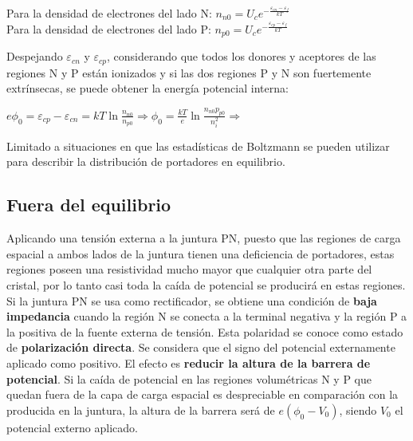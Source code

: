 \documentclass[oneside]{book}
\numberwithin{equation}{section}
\numberwithin{figure}{section}
\numberwithin{table}{section}
\begin{document}
				\begin{center}
					Para la densidad de electrones del lado N: $\displaystyle n_{n0}=U_c e^{-\frac{\varepsilon_{cn}-\varepsilon_f}{kT}}$\\
					Para la densidad de electrones del lado P: $\displaystyle n_{p0}=U_c e^{-\frac{\varepsilon_{cp}-\varepsilon_f}{kT}}$\\		
				\end{center}				
			
			Despejando $\varepsilon_{cn}$ y $\varepsilon_{cp}$, considerando que todos los donores y aceptores de las regiones N y P están ionizados y si las dos regiones P y N son fuertemente extrínsecas, se puede obtener la energía potencial interna:\\
			
			\begin{center}
				$e\phi_0=\varepsilon_{cp}-\varepsilon_{cn}=kT\ln \frac{n_{n0}}{n_{p0}} \Rightarrow \phi_0=\frac{kT}{e}\ln \frac{n_{n0}p_{p0}}{n_i^2} \Rightarrow$ 
			\end{center}			
			
			Limitado a situaciones en que las estadísticas de Boltzmann se pueden utilizar para describir la distribución de portadores en equilibrio.
			
			\subsection{Fuera del equilibrio}
			
				Aplicando una tensión externa a la juntura PN, puesto que las regiones de carga espacial a ambos lados de la juntura tienen una deficiencia de portadores, estas regiones poseen una resistividad mucho mayor que cualquier otra parte del cristal, por lo tanto casi toda la caída de potencial se producirá en estas regiones.\\
				
				Si la juntura PN se usa como rectificador, se obtiene una condición de \textbf{baja impedancia} cuando la región N se conecta a la terminal negativa y la región P a la positiva de la fuente externa de tensión. Esta polaridad se conoce como estado de \textbf{polarización directa}. Se considera que el signo del potencial externamente aplicado como positivo. El efecto es \textbf{reducir la altura de la barrera de potencial}. Si la caída de potencial en las regiones volumétricas N y P que quedan fuera de la capa de carga espacial es despreciable en comparación con la producida en la juntura, la altura de la barrera será de $e(\phi_0-V_0)$, siendo $V_0$ el potencial externo aplicado.\\
			
\end{document}
